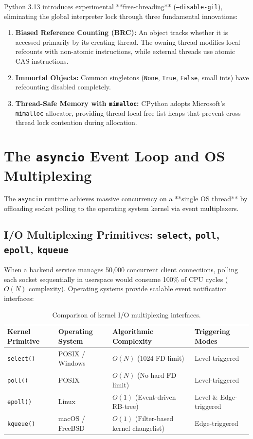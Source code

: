 Python 3.13 introduces experimental **free-threading** (\texttt{--disable-gil}), eliminating the global interpreter lock through three fundamental innovations:
\begin{enumerate}[leftmargin=15pt]
  \item \textbf{Biased Reference Counting (BRC):} An object tracks whether it is accessed primarily by its creating thread. The owning thread modifies local refcounts with non-atomic instructions, while external threads use atomic CAS instructions.
  \item \textbf{Immortal Objects:} Common singletons (\texttt{None}, \texttt{True}, \texttt{False}, small ints) have refcounting disabled completely.
  \item \textbf{Thread-Safe Memory with \texttt{mimalloc}:} CPython adopts Microsoft's \texttt{mimalloc} allocator, providing thread-local free-list heaps that prevent cross-thread lock contention during allocation.
\end{enumerate}

\section{The \texttt{asyncio} Event Loop and OS Multiplexing}

The \texttt{asyncio} runtime achieves massive concurrency on a **single OS thread** by offloading socket polling to the operating system kernel via event multiplexers.

\subsection{I/O Multiplexing Primitives: \texttt{select}, \texttt{poll}, \texttt{epoll}, \texttt{kqueue}}

When a backend service manages 50,000 concurrent client connections, polling each socket sequentially in userspace would consume 100\% of CPU cycles ($O(N)$ complexity). Operating systems provide scalable event notification interfaces:

\begin{table}[htbp]
\centering
\small\sffamily
\begin{tabular}{@{}llll@{}}
\toprule
\textbf{Kernel Primitive} & \textbf{Operating System} & \textbf{Algorithmic Complexity} & \textbf{Triggering Modes} \\ \midrule
\texttt{select()} & POSIX / Windows & $O(N)$ (1024 FD limit) & Level-triggered \\
\texttt{poll()} & POSIX & $O(N)$ (No hard FD limit) & Level-triggered \\
\texttt{epoll()} & Linux & $O(1)$ (Event-driven RB-tree) & Level \& Edge-triggered \\
\texttt{kqueue()} & macOS / FreeBSD & $O(1)$ (Filter-based kernel changelist) & Edge-triggered \\ \bottomrule
\end{tabular}
\caption{Comparison of kernel I/O multiplexing interfaces.}
\label{tab:multiplexing}
\end{table}

